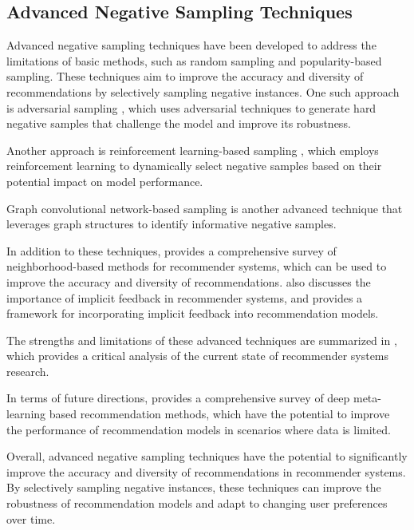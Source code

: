 \documentclass[11pt,a4paper]{article}
\begin{document}
\subsection{Advanced Negative Sampling Techniques}


Advanced negative sampling techniques have been developed to address the limitations of basic methods, such as random sampling and popularity-based sampling. These techniques aim to improve the accuracy and diversity of recommendations by selectively sampling negative instances. One such approach is adversarial sampling \cite{doi:10.1587/transinf.2017edr0003}, which uses adversarial techniques to generate hard negative samples that challenge the model and improve its robustness. 

Another approach is reinforcement learning-based sampling \cite{arxiv:1905.01997}, which employs reinforcement learning to dynamically select negative samples based on their potential impact on model performance. 

Graph convolutional network-based sampling \cite{doi:10.1609/aaai.v34i04.6094} is another advanced technique that leverages graph structures to identify informative negative samples. 

In addition to these techniques, \cite{doi:10.1007/978-1-0716-2197-4_2} provides a comprehensive survey of neighborhood-based methods for recommender systems, which can be used to improve the accuracy and diversity of recommendations. \cite{doi:10.1007/978-1-0716-2197-4_4} also discusses the importance of implicit feedback in recommender systems, and provides a framework for incorporating implicit feedback into recommendation models.

The strengths and limitations of these advanced techniques are summarized in \cite{doi:10.1145/3434185}, which provides a critical analysis of the current state of recommender systems research. 

In terms of future directions, \cite{arxiv:2206.04415} provides a comprehensive survey of deep meta-learning based recommendation methods, which have the potential to improve the performance of recommendation models in scenarios where data is limited. 

Overall, advanced negative sampling techniques have the potential to significantly improve the accuracy and diversity of recommendations in recommender systems. By selectively sampling negative instances, these techniques can improve the robustness of recommendation models and adapt to changing user preferences over time. 
\end{document}
